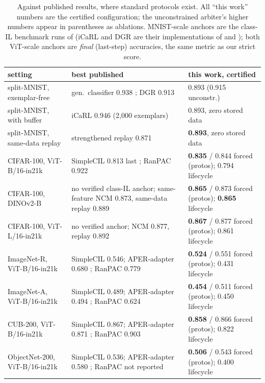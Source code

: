 \documentclass{article}
\begin{document}
\begin{table}[t]
\centering
\caption{Against published results, where standard protocols exist. All
``this work'' numbers are the certified configuration; the unconstrained
arbiter's higher numbers appear in parentheses as ablations. MNIST-scale
anchors are the class-IL benchmark runs of
\citet{vandeven2019three,vandeven2021generative} (iCaRL and DGR are their
implementations of \citet{rebuffi2017icarl} and \citet{shin2017dgr}); both
ViT-scale anchors are \emph{final} (last-step) accuracies, the same metric as
our strict score.}
\label{tab:published}
\small
\begin{tabular}{lll}
\toprule
setting & best published & \textbf{this work, certified} \\
\midrule
split-MNIST, exemplar-free & gen.\ classifier 0.938 \citep{vandeven2021generative}; DGR 0.913 \citep{shin2017dgr} & 0.893 (0.915 unconstr.)\\
split-MNIST, with buffer & iCaRL 0.946 \citep{rebuffi2017icarl} (2{,}000 exemplars) & 0.893, zero stored data\\
split-MNIST, same-data replay & strengthened replay 0.871 & \textbf{0.893}, zero stored data\\
CIFAR-100, ViT-B/16-in21k & SimpleCIL 0.813 last \citep{zhou2023simplecil}; RanPAC 0.922 \citep{mcdonnell2023ranpac} & \textbf{0.835} / 0.844 forced (protos); 0.794 lifecycle\\
CIFAR-100, DINOv2-B & no verified class-IL anchor; same-feature NCM 0.873, same-data replay 0.889 & \textbf{0.865} / 0.873 forced (protos); \textbf{0.865} lifecycle\\
CIFAR-100, ViT-L/16-in21k & no verified anchor; NCM 0.877, replay 0.892 & \textbf{0.867} / 0.877 forced (protos); 0.861 lifecycle\\
ImageNet-R, ViT-B/16-in21k & SimpleCIL 0.546; APER-adapter 0.680 \citep{zhou2023simplecil}; RanPAC 0.779 \citep{mcdonnell2023ranpac} & \textbf{0.524} / 0.551 forced (protos); 0.431 lifecycle\\
ImageNet-A, ViT-B/16-in21k & SimpleCIL 0.489; APER-adapter 0.494 \citep{zhou2023simplecil}; RanPAC 0.624 \citep{mcdonnell2023ranpac} & \textbf{0.454} / 0.511 forced (protos); 0.450 lifecycle\\
CUB-200, ViT-B/16-in21k & SimpleCIL 0.867; APER-adapter 0.871 \citep{zhou2023simplecil}; RanPAC 0.903 \citep{mcdonnell2023ranpac} & \textbf{0.858} / 0.866 forced (protos); 0.822 lifecycle\\
ObjectNet-200, ViT-B/16-in21k & SimpleCIL 0.536; APER-adapter 0.580 \citep{zhou2023simplecil}; RanPAC not reported & \textbf{0.506} / 0.543 forced (protos); 0.400 lifecycle\\

\end{tabular}
\end{table}
\end{document}
